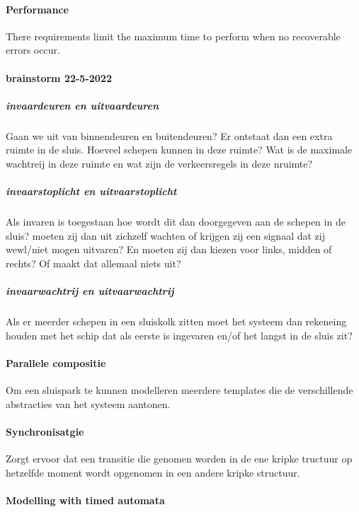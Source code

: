 \paragraph{Performance}
There requirements limit the maximum time to perform when no recoverable errors occur.



\paragraph{brainstorm 22-5-2022}

\subparagraph{invaardeuren en uitvaardeuren}
Gaan we uit van binnendeuren en buitendeuren? Er ontstaat dan een extra ruimte in de sluis. Hoeveel schepen kunnen in deze ruimte? Wat is de maximale wachtreij in deze ruimte en wat zijn de verkeersregels in deze nruimte?
\subparagraph{invaarstoplicht en uitvaarstoplicht}
Als invaren is toegestaan hoe wordt dit dan doorgegeven aan de schepen in de sluis? moeten zij dan uit zichzelf wachten of krijgen zij een signaal dat zij wewl/niet mogen uitvaren? En moeten zij dan kiezen voor links, midden of rechts? Of maakt dat allemaal niets uit?

\subparagraph{invaarwachtrij en uitvaarwachtrij}
Als er meerder schepen in een sluiskolk zitten moet het systeem dan rekeneing houden met het schip dat als eerste is ingevaren en/of het langst in de sluis zit?






\paragraph{Parallele compositie}
Om een sluispark te kunnen modelleren meerdere templates die de verschillende abstracties van het systeem aantonen.

\paragraph{Synchronisatgie}
Zorgt ervoor dat  een transitie die genomen worden in de ene kripke tructuur op hetzelfde moment wordt opgenomen in een andere kripke structuur.

\paragraph{Modelling with timed automata}
